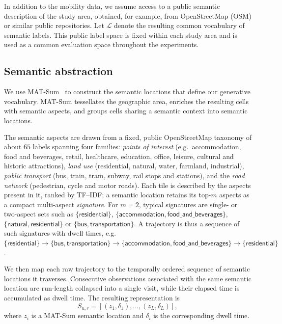 \documentclass[sigconf,nonacm]{acmart}
\begin{document}
In addition to the mobility data, we assume access to a
public semantic description of the study area, obtained, for example, from
OpenStreetMap (OSM) or similar public repositories. Let $\mathcal{L}$ denote the resulting common
vocabulary of semantic labels. This public label space is fixed within each study area and is used as a common evaluation space throughout the experiments.

\subsection{Semantic abstraction}
\label{sec:semantic-abstraction}

We use MAT-Sum~\cite{pugliese2023} to construct the semantic locations that define our generative vocabulary. MAT-Sum tessellates the geographic area, enriches the resulting cells with semantic aspects, and groups cells sharing a semantic context into semantic locations.

The semantic aspects are drawn from a fixed, public OpenStreetMap taxonomy of about $65$ labels spanning
four families: \emph{points of interest} (e.g.\ accommodation, food and beverages, retail, healthcare,
education, office, leisure, cultural and historic attractions), \emph{land use} (residential, natural,
water, farmland, industrial), \emph{public transport} (bus, train, tram, subway, rail stops and stations),
and the \emph{road network} (pedestrian, cycle and motor roads). Each tile is described by the aspects
present in it, ranked by TF--IDF; a semantic location retains its top-$m$ aspects as a compact
multi-aspect \emph{signature}. For $m{=}2$, typical signatures are single- or two-aspect sets such as
$\{\textsf{residential}\}$, $\{\textsf{accommodation}, \textsf{food\_and\_beverages}\}$,
$\{\textsf{natural}, \textsf{residential}\}$ or $\{\textsf{bus}, \textsf{transportation}\}$. A trajectory
is thus a sequence of such signatures with dwell times, e.g.\
$\{\textsf{residential}\}\!\rightarrow\!\{\textsf{bus},\textsf{transportation}\}\!\rightarrow\!
\{\textsf{accommodation},\textsf{food\_and\_beverages}\}\!\rightarrow\!\{\textsf{residential}\}$.


We then map each raw trajectory to the temporally ordered sequence of semantic locations it traverses. Consecutive observations associated with the same semantic location are run-length collapsed into a single visit, while their elapsed time is accumulated as dwell time.
The resulting representation is
\[
S_{u,r} =
\left[
(z_1,\delta_1),\ldots,(z_L,\delta_L)
\right],
\]
where $z_i$ is a MAT-Sum semantic location and $\delta_i$ is the
corresponding dwell time.
\end{document}

